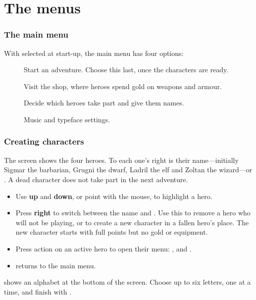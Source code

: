 \chapter{The menus}\label{cap:menus}
\subsection{The main menu}
With  selected at start-up, the main menu has four options:
\begin{description}
\item[] Start an adventure. Choose this last, once the characters are ready.
\item[] Visit the shop, where heroes spend gold on weapons and armour.
\item[] Decide which heroes take part and give them names.
\item[] Music and typeface settings.
\end{description}
\subsection{Creating characters}
The  screen shows the four heroes. To each one's right is their name---initially Sigmar the barbarian, Grugni the dwarf, Ladril the elf and Zoltan the wizard---or . A dead character does not take part in the next adventure.
\begin{itemize}
\item Use \textbf{up} and \textbf{down}, or point with the mouse, to highlight a hero.
\item Press \textbf{right} to switch between the name and . Use this to remove a hero who will not be playing, or to create a new character in a fallen hero's place. The new character starts with full points but no gold or equipment.
\item Press action on an active hero to open their menu: ,  and .
\item {} returns to the main menu.
\end{itemize}
 shows an alphabet at the bottom of the screen. Choose up to six letters, one at a time, and finish with .

